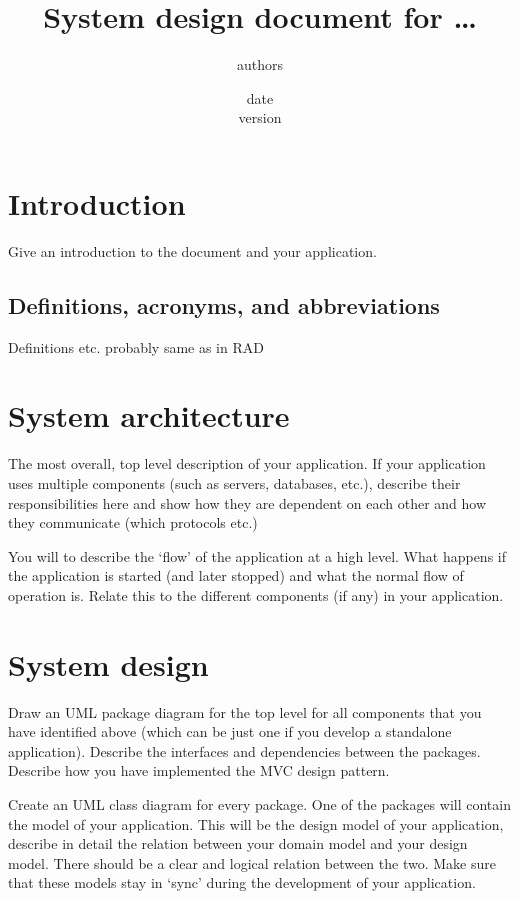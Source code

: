 \documentclass[12pt,a4paper]{scrartcl}
\title{System design document for \ldots}
\author{authors}
\date{date\\version}
\begin{document}
\maketitle

\section{Introduction}

Give an introduction to the document and your application.

\subsection{Definitions, acronyms, and abbreviations}

Definitions etc. probably same as in RAD


\section{System architecture}

The most overall, top level description of your application. If your application
uses multiple components (such as servers, databases, etc.), describe their
responsibilities here and show how they are dependent on each other and how they
communicate (which protocols etc.)

You will to describe the `flow' of the application at a high level. What happens
if the application is started (and later stopped) and what the normal flow of
operation is. Relate this to the different components (if any) in your
application.


\section{System design}

Draw an UML package diagram for the top level for all components that you have
identified above (which can be just one if you develop a standalone application).
Describe the interfaces and dependencies between the packages. Describe how you
have implemented the MVC design pattern.

Create an UML class diagram for every package. One of the packages will contain
the model of your application. This will be the design model of your
application, describe in detail the relation between your domain model and your
design model. There should be a clear and logical relation between the two. Make
sure that these models stay in `sync' during the development of your application.
\end{document}
